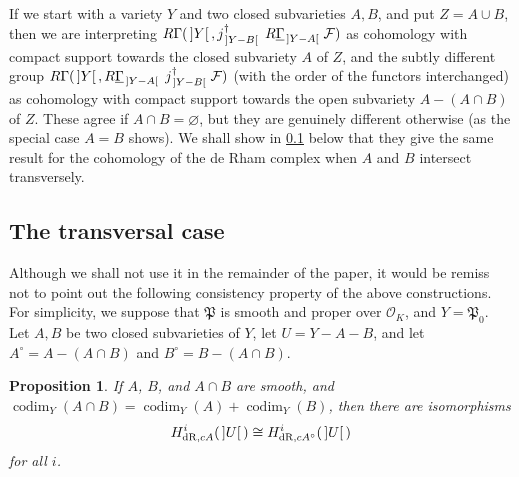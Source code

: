 \documentclass[cjm]{ipart}
\theoremstyle{plain}
\newtheorem{proposition}[theorem]{Proposition}
\theoremstyle{remark}
\DeclareMathOperator{\codim}{codim}
\DeclarePairedDelimiter{\tb}{{\,]}}{{[\, }} %
\newcommand{\cF}{\mathcal{F}}
\newcommand{\cO}{\mathcal{O}}
\newcommand{\dR}{\mathrm{dR}}
\newcommand{\fP}{\mathfrak{P}}
\newcommand{\uGa}{\underline{\Gamma}}
\numberwithin{equation}{subsection}
\begin{document}
  \begin{remark}
   If we start with a variety $Y$ and two closed subvarieties $A, B$, and put $Z = A \cup B$, then we are interpreting $R\Gamma(\tb{Y}, j^{\dag}_{\tb{Y - B}}\ R\uGa_{\tb{Y - A}}\, \cF)$ as cohomology with compact support towards the closed subvariety $A$ of $Z$, and the subtly different group $R\Gamma(\tb{Y}, R\uGa_{\tb{Y - A}}\ j^{\dag}_{\tb{Y - B}}\, \cF)$ (with the order of the functors interchanged) as cohomology with compact support towards the open subvariety $A - (A\cap B)$ of $Z$. These agree if $A \cap B = \varnothing$, but they are genuinely different otherwise (as the special case $A = B$ shows). We shall show in \cref{sect:transverse} below that they give the same result for the cohomology of the de Rham complex when $A$ and $B$ intersect transversely.
  \end{remark}

 \subsection{The transversal case}
  \label{sect:transverse}

  Although we shall not use it in the remainder of the paper, it would be remiss not to point out the following consistency property of the above constructions. For simplicity, we suppose that $\fP$ is smooth and proper over $\cO_K$, and $Y = \fP_0$. Let $A, B$ be two closed subvarieties of $Y$, let $U = Y - A - B$, and let $A^\circ = A - (A \cap B)$ and $B^\circ = B - (A \cap B)$.

  \begin{proposition}
   If $A$, $B$, and $A \cap B$ are smooth, and $\codim_Y(A\cap B) = \codim_Y(A) + \codim_Y(B)$, then there are isomorphisms
   \[ H^i_{\dR, cA}(\tb{U}) \cong H^i_{\dR, cA^\circ}(\tb{U}) \]
   for all $i$.
  \end{proposition}
\end{document}

